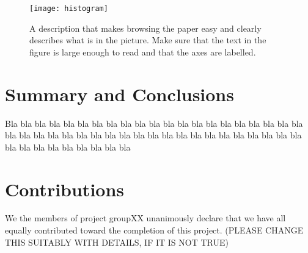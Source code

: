 \documentclass[a4paper,12pt]{article}
\begin{document}
 

\begin{figure}
\centering
\texttt{[image: histogram]}
\caption{A description that makes browsing the paper easy and clearly 
describes what is in the picture. Make sure that the text in the figure 
is large enough to read and that the axes are labelled.}
\label{fig:histogram}
\end{figure}
 

\section{Summary and Conclusions}
\label{sec:summary}

Bla bla bla bla bla bla bla bla bla bla bla bla bla bla bla bla bla 
bla bla bla bla bla bla bla bla bla bla bla bla bla bla bla bla bla 
bla bla bla bla bla bla bla bla bla bla bla bla bla bla bla bla bla 


\section{Contributions}
\label{sec:contributions}
We the members of project groupXX unanimously declare that 
we have all equally contributed toward the completion of this
project. (PLEASE CHANGE THIS SUITABLY WITH DETAILS, IF IT IS NOT TRUE)




\end{document}
